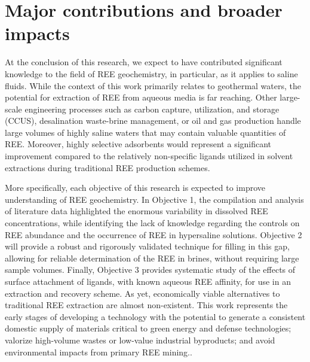 \chapter{Major contributions and broader impacts}
\vspace{-1cm}

At the conclusion of this research, we expect to have contributed significant knowledge to the field of REE geochemistry, in particular, as it applies to saline fluids.
While the context of this work primarily relates to geothermal waters, the potential for extraction of REE from aqueous media is far reaching.
Other large-scale engineering processes such as carbon capture, utilization, and storage (CCUS), desalination waste-brine management, or oil and gas production handle large volumes of highly saline waters that may contain valuable quantities of REE.
Moreover, highly selective adsorbents would represent a significant improvement compared to the relatively non-specific ligands utilized in solvent extractions during traditional REE production schemes.

More specifically, each objective of this research is expected to improve understanding of REE geochemistry.
In Objective 1, the compilation and analysis of literature data highlighted the enormous variability in dissolved REE concentrations, while identifying the lack of knowledge regarding the controls on REE abundance and the occurrence of REE in hypersaline solutions.
Objective 2 will provide a robust and rigorously validated technique for filling in this gap, allowing for reliable determination of the REE in brines, without requiring large sample volumes.
Finally, Objective 3 provides systematic study of the effects of surface attachment of ligands, with known aqueous REE affinity, for use in an extraction and recovery scheme.
As yet, economically viable alternatives to traditional REE extraction are almost non-existent.
This work represents the early stages of developing a technology with the potential to generate a consistent domestic supply of materials critical to green energy and defense technologies; valorize high-volume wastes or low-value industrial byproducts; and avoid environmental impacts from primary REE mining..
